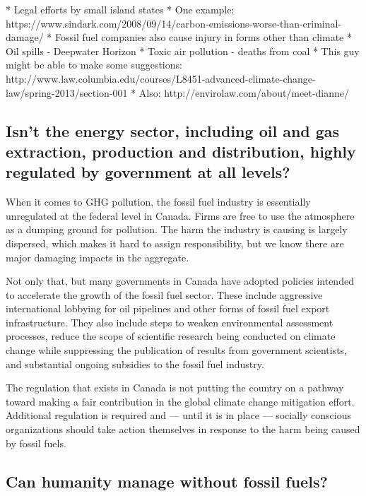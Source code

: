 \begin{vcom}
* Legal efforts by small island states
* One example: https://www.sindark.com/2008/09/14/carbon-emissions-worse-than-criminal-damage/
* Fossil fuel companies also cause injury in forms other than climate
* Oil spills - Deepwater Horizon
* Toxic air pollution - deaths from coal
* This guy might be able to make some suggestions: http://www.law.columbia.edu/courses/L8451-advanced-climate-change-law/spring-2013/section-001
* Also: http://envirolaw.com/about/meet-dianne/
\end{vcom}
	
	
	
	\subsection{Isn't the energy sector, including oil and gas extraction, production and distribution, highly regulated by government at all levels?}
	\label{HeavilyRegulated}
	


When it comes to GHG pollution, the fossil fuel industry is essentially unregulated at the federal level in Canada.
Firms are free to use the atmosphere as a dumping ground for  pollution.
The harm the industry is causing is largely dispersed, which makes it hard to assign responsibility, but we know there are major damaging impacts in the aggregate.



Not only that, but many governments in Canada have adopted policies intended to accelerate the growth of the fossil fuel sector.
These include aggressive international lobbying for oil pipelines and other forms of fossil fuel export infrastructure.
They also include steps to weaken environmental assessment processes, reduce the scope of scientific research being conducted on climate change while suppressing the publication of results from government scientists, and substantial ongoing subsidies to the fossil fuel industry.



The regulation that exists in Canada is not putting the country on a pathway toward making a fair contribution in the global climate change mitigation effort.
Additional regulation is required and --- until it is in place --- socially conscious organizations should take action themselves in response to the harm being caused by fossil fuels.


	
	\subsection{Can humanity manage without fossil fuels?}
	\label{DoingWithout}



